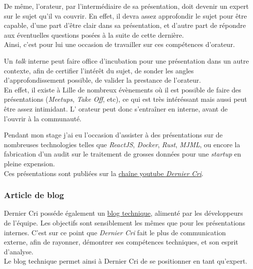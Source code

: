 \documentclass[12pt,a4paper]{article}
\begin{document}
  \bigskip

  De même, l'orateur, par l'intermédiaire de sa présentation, doit devenir
  un expert sur le sujet qu'il va couvrir. En effet, il devra assez
  approfondir le sujet pour être capable, d'une part d'être clair dans sa
  présentation, et d'autre part de répondre aux éventuelles questions
  posées à la suite de cette dernière.\\
  Ainsi, c'est pour lui une occasion de travailler sur ces compétences
  d'orateur.

  \bigskip

  Un \emph{talk} interne peut faire office d'incubation pour une
  présentation dans un autre contexte, afin de certifier l'intérêt du
  sujet, de sonder les angles d'approfondissement possible, de valider la
  prestance de l'orateur.\\
  En effet, il existe à Lille de nombreux évènements où il est possible de
  faire des présentations (\emph{Meetups}, \emph{Take Off}, etc), ce qui
  est très intéréssant mais aussi peut être assez intimidant. L' orateur
  peut donc s'entraîner en interne, avant de l'ouvrir à la communauté.

  \bigskip

  Pendant mon stage j'ai eu l'occasion d'assister à des présentations sur
  de nombreuses technologies telles que \emph{ReactJS}, \emph{Docker},
  \emph{Rust}, \emph{MJML}, ou encore la fabrication d'un audit sur le
  traitement de grosses données pour une \emph{startup} en pleine
  expension.\\
  Ces présentations sont publiées sur la
  \href{https://www.youtube.com/channel/UCDfdBlzldhg_PEu3xZTPsHg}{chaîne
  youtube \emph{Dernier Cri}}.

  \bigskip

  \subsubsection{Article de blog}\label{article-de-blog}

  \bigskip

  Dernier Cri posséde également un
  \href{http://derniercri.io/tech-blog}{blog technique}, alimenté par les
  développeurs de l'équipe. Les objectifs sont sensiblement les mêmes que
  pour les présentations internes. C'est sur ce point que \emph{Dernier
  Cri} fait le plus de communication externe, afin de rayonner, démontrer
  ses compétences techniques, et son esprit d'analyse.\\
  Le blog technique permet ainsi à Dernier Cri de se positionner en tant
  qu'expert.
\end{document}
